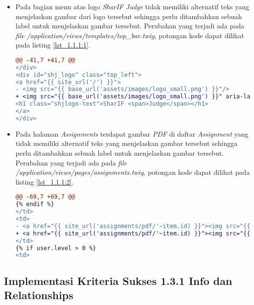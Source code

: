 \begin{itemize}
	\item Pada bagian menu atas logo \textit{SharIF Judge} tidak memiliki alternatif teks yang menjelaskan gambar dari logo tersebut sehingga perlu ditambahkan sebuah label untuk menjelaskan gambar tersebut. Perubahan yang terjadi ada pada \textit{file} \textit{/application/views/templates/top\_bar.twig}, potongan kode dapat dilihat pada listing \ref{lst_1.1.1:1}.
	
\begin{lstlisting}[language=diff, caption=Perubahan pada \textit{file} \textit{top\_bar.twig}, label=lst_1.1.1:1, basicstyle=\ttfamily, frame=single,
columns=fullflexible, keepspaces=true, breaklines=true]
@@ -41,7 +41,7 @@
</div>
<div id="shj_logo" class="top_left">
<a href="{{ site_url('/') }}">
- <img src="{{ base_url('assets/images/logo_small.png') }}"/>
+ <img src="{{ base_url('assets/images/logo_small.png') }}" aria-label="Logo SharIF Judge"/>
<h1 class="shjlogo-text">SharIF <span>Judge</span></h1>
</a>
</div>
\end{lstlisting}

	\item Pada halaman \textit{Assignments} terdapat gambar \textit{PDF} di daftar \textit{Assignment} yang tidak memiliki alternatif teks yang menjelaskan gambar tersebut sehingga perlu ditambahkan sebuah label untuk menjelaskan gambar tersebut. Perubahan yang terjadi ada pada \textit{file} \textit{/application/views/pages/assignments.twig}, potongan kode dapat dilihat pada listing \ref{lst_1.1.1:2}.
	
\begin{lstlisting}[language=diff, caption=Perubahan pada \textit{file} \textit{assignments.twig}, label=lst_1.1.1:2, basicstyle=\ttfamily, frame=single,
columns=fullflexible, keepspaces=true, breaklines=true]
@@ -69,7 +69,7 @@
{% endif %}
</td>
<td>
- <a href="{{ site_url('assignments/pdf/'~item.id) }}"><img src="{{ base_url('assets/images/pdf.svg') }}" /></a>
+ <a href="{{ site_url('assignments/pdf/'~item.id) }}"><img src="{{ base_url('assets/images/pdf.svg') }}" aria-label="Download PDF For Assignment {{ item.name }}"/></a>
</td>
{% if user.level > 0 %}
<td>
\end{lstlisting}
\end{itemize}

\subsection{Implementasi Kriteria Sukses 1.3.1 Info dan Relationships}
\label{subsec:implementasi_A_1.3.1}

